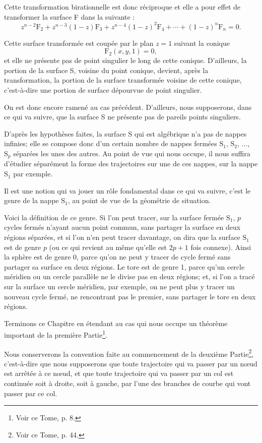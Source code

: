 \documentclass[11pt]{article}
\begin{document}
Cette transformation birationnelle est donc réciproque et elle a pour effet de transformer la surface F dans la suivante :
\[
z^{n-2}\mathrm{F}_2+z^{n-3}(1-z)\mathrm{F}_3+z^{n-4}(1-z)^2\mathrm{F}_4+\cdots+(1-z)^n\mathrm{F}_n=0.
\]

Cette surface transformée est coupée par le plan $z=1$ suivant la conique
\[
\mathrm{F}_2(x,y,1)=0,
\]
et elle ne présente pas de point singulier le long de cette conique. D’ailleurs, la portion de la surface S, voisine du point conique, devient, après la transformation, la portion de la surface transformée voisine de cette conique, c’est-à-dire une portion de surface dépourvue de point singulier.

On est donc encore ramené au cas précédent. D’ailleurs, nous supposerons, dans ce qui va suivre, que la surface S ne présente pas de pareils points singuliers.

D’après les hypothèses faites, la surface S qui est algébrique n’a pas de nappes infinies; elle se compose donc d’un certain nombre de nappes fermées $\mathrm{S}_1$, $\mathrm{S}_2$, $\ldots$, $\mathrm{S}_p$ séparées les unes des autres. Au point de vue qui nous occupe, il nous suffira d’étudier séparément la forme des trajectoires sur une de ces nappes, sur la nappe $\mathrm{S}_1$ par exemple.

Il est une notion qui va jouer un rôle fondamental dans ce qui va suivre, c’est le genre de la nappe $\mathrm{S}_1$, au point de vue de la géométrie de situation.

Voici la définition de ce genre. Si l’on peut tracer, sur la surface fermée $\mathrm{S}_1$, $p$ cycles fermés n’ayant aucun point commun, sans partager la surface en deux régions séparées, et si l’on n’en peut tracer davantage, on dira que la surface $\mathrm{S}_1$ est de genre $p$ (ou ce qui revient au même qu’elle est $2p+1$ fois connexe). Ainsi la sphère est de genre 0, parce qu’on ne peut y tracer de cycle fermé sans partager sa surface en deux régions. Le tore est de genre 1, parce qu’un cercle méridien ou un cercle parallèle ne le divise pas en deux régions; et, si l’on a tracé sur la surface un cercle méridien, par exemple, on ne peut plus y tracer un nouveau cycle fermé, ne rencontrant pas le premier, sans partager le tore en deux régions.

Terminons ce Chapitre en étendant au cas qui nous occupe un théorème important de la première Partie\footnote{Voir ce Tome, p. 8.}.

Nous conserverons la convention faite au commencement de la deuxième Partie\footnote{Voir ce Tome, p. 44.}, c’est-à-dire que nous supposerons que toute trajectoire qui va passer par un nœud est arrêtée à ce nœud, et que toute trajectoire qui va passer par un col est continuée soit à droite, soit à gauche, par l’une des branches de courbe qui vont passer par ce col.
\end{document}

